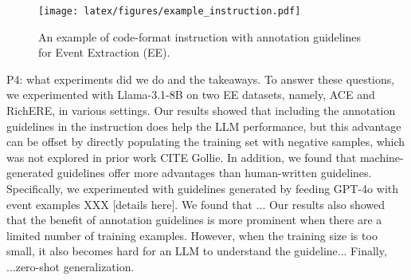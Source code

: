 \begin{figure}[t!]
    \centering
    \texttt{[image: latex/figures/example\_instruction.pdf]}
    \caption{An example of code-format instruction with annotation guidelines for Event Extraction (EE).  }
    \label{fig:example_instruction}
\end{figure}

P4: what experiments did we do and the takeaways. To answer these questions, we experimented with Llama-3.1-8B on two EE datasets, namely, ACE and RichERE, in various settings. Our results showed that including the annotation guidelines in the instruction does help the LLM performance, but this advantage can be offset by directly populating the training set with negative samples, which was not explored in prior work CITE Gollie. In addition, we found that machine-generated guidelines offer more advantages than human-written guidelines. Specifically, we experimented with guidelines generated by feeding GPT-4o with event examples XXX [details here]. We found that ... Our results also showed that the benefit of annotation guidelines is more prominent when there are a limited number of training examples. However, when the training size is too small, it also becomes hard for an LLM to understand the guideline... Finally, ...zero-shot generalization. 

